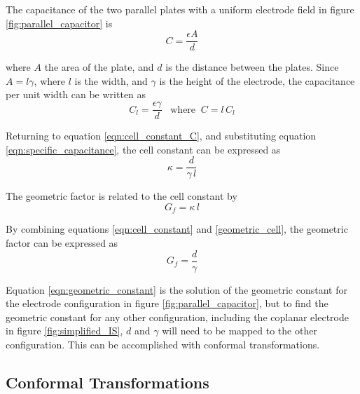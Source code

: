   \par The capacitance of the two parallel plates with a uniform electrode field in figure \ref{fig:parallel_capacitor} is
  \begin{equation}
      C = \frac{\epsilon A}{d}
      \label{eqn:capacitor}
  \end{equation}
  
  \noindent where $A$ the area of the plate, and $d$ is the distance between the plates. Since $A = l\gamma$, where $l$ is the width, and $\gamma$ is the height of the electrode, the capacitance per unit width can be written as
  \begin{equation}
      C_l = \frac{\epsilon\gamma}{d} \;\;\;\text{where} \;\; C =l\, C_l
      \label{eqn:specific_capacitance}
  \end{equation}
  
  \par Returning to equation \ref{eqn:cell_constant_C}, and substituting equation \ref{eqn:specific_capacitance}, the cell constant can be expressed as 
  \begin{equation}
      \kappa = \frac{d}{\gamma \, l}
      \label{eqn:cell_constant}
  \end{equation}
  
  \noindent The geometric factor is related to the cell constant by 
  \begin{equation}
       G_f = \kappa \,l
       \label{geometric_cell}
  \end{equation}

  \noindent By combining equations \ref{eqn:cell_constant} and \ref{geometric_cell}, the geometric factor can be expressed as
  \begin{equation}
      G_f = \frac{d}{\gamma}
      \label{eqn:geometric_constant}
  \end{equation}
  
  \par Equation \ref{eqn:geometric_constant} is the solution of the geometric constant for the electrode configuration in figure \ref{fig:parallel_capacitor}, but to find the geometric constant for any other configuration, including the coplanar electrode in figure \ref{fig:simplified_IS}, $d$ and $\gamma$ will need to be mapped to the other configuration. This can be accomplished with conformal transformations.
  
  
  \subsection{Conformal Transformations}
  
